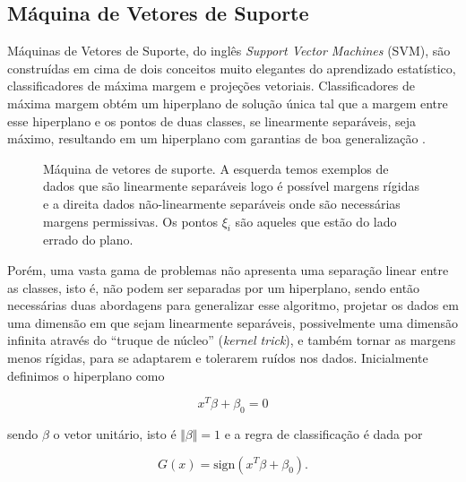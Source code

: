 \subsection{Máquina de Vetores de Suporte}
Máquinas de Vetores de Suporte, do inglês \textit{Support Vector Machines} (SVM), são construídas em cima de dois conceitos muito
elegantes do aprendizado estatístico, classificadores de máxima margem e
projeções vetoriais. Classificadores de máxima margem obtém um hiperplano de
solução única tal que a margem entre esse hiperplano e os pontos de duas
classes, se linearmente separáveis, seja máximo, resultando em um hiperplano
com garantias de boa generalização \cite{vapnik2013nature}.

\begin{figure}[ht]
   \centering
    \begin{subfigure}{.48\textwidth}
        \centering
        \def\svgwidth{\linewidth}
    \end{subfigure}
     \hfill
    \begin{subfigure}{.48\textwidth}
        \centering
        \def\svgwidth{\linewidth}
    \end{subfigure}
    \caption{Máquina de vetores de suporte. A esquerda temos exemplos de dados
    que são linearmente separáveis logo é possível margens rígidas e a direita
    dados não-linearmente separáveis onde são necessárias margens permissivas.
    Os pontos $\xi_i$ são aqueles que estão do lado errado do plano.}
    \label{fig:svm}
\end{figure}

Porém, uma vasta gama de problemas não apresenta uma separação linear entre as
classes, isto é, não podem ser separadas por um hiperplano, sendo então necessárias
duas abordagens para generalizar esse algoritmo, projetar
os dados em uma dimensão em que sejam linearmente separáveis, possivelmente uma
dimensão infinita através do ``truque de núcleo'' (\textit{kernel trick}), e
também tornar as margens menos rígidas, para se adaptarem e tolerarem ruídos nos dados.
Inicialmente definimos o hiperplano como

\begin{equation}
    \label{eq:svm_func}
    x^T\beta + \beta_0 = 0
\end{equation}

sendo $\beta$ o vetor unitário, isto é $\Vert\beta\Vert = 1$ e a regra de
classificação é dada por

\begin{equation}
    \label{eq:svm_sign}
    G(x) = \text{sign}(x^T\beta + \beta_0).
\end{equation}


